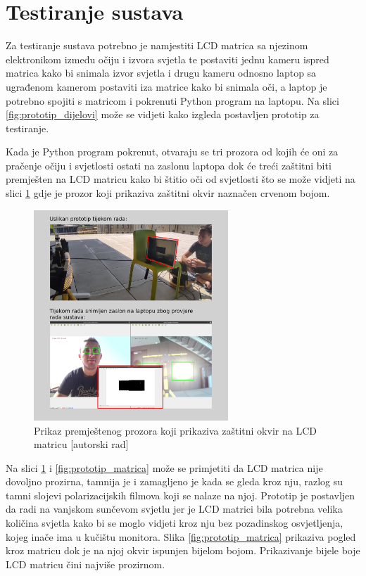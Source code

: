 \documentclass{foi}
\begin{document}
\newpage
\section{Testiranje sustava}

Za testiranje sustava potrebno je namjestiti LCD matrica sa njezinom elektronikom između očiju i izvora svjetla te postaviti jednu kameru ispred matrica kako bi snimala izvor svjetla i drugu kameru odnosno laptop sa ugrađenom kamerom postaviti iza matrice kako bi snimala oči, a laptop je potrebno spojiti s matricom i pokrenuti Python program na laptopu. Na slici \ref{fig:prototip_dijelovi} može se vidjeti kako izgleda postavljen prototip za testiranje.

Kada je Python program pokrenut, otvaraju se tri prozora od kojih će oni za pračenje očiju i svjetlosti ostati na zaslonu laptopa dok će treći zaštitni biti premješten na LCD matricu kako bi štitio oči od svjetlosti što se može vidjeti na slici \ref{fig:prototip_prozori} gdje je prozor koji prikaziva zaštitni okvir naznačen crvenom bojom.

\begin{figure}[h!]
    \centering
    \includegraphics[width=0.65\textwidth]{slike/prototip_prozori}
    \caption{Prikaz premještenog prozora koji prikaziva zaštitni okvir na LCD matricu [autorski rad]}
    \label{fig:prototip_prozori}
\end{figure}

\newpage
Na slici \ref{fig:prototip_prozori} i \ref{fig:prototip_matrica} može se primjetiti da LCD matrica nije dovoljno prozirna, tamnija je i zamagljeno je kada se gleda kroz nju, razlog su tamni slojevi polarizacijskih filmova koji se nalaze na njoj. Prototip je postavljen da radi na vanjskom sunčevom svjetlu jer je LCD matrici bila potrebna velika količina svjetla kako bi se moglo vidjeti kroz nju bez pozadinskog osvjetljenja, kojeg inače ima u kučištu monitora. Slika \ref{fig:prototip_matrica} prikaziva pogled kroz matricu dok je na njoj okvir ispunjen bijelom bojom. Prikazivanje bijele boje LCD matricu čini najviše prozirnom.
\end{document}
